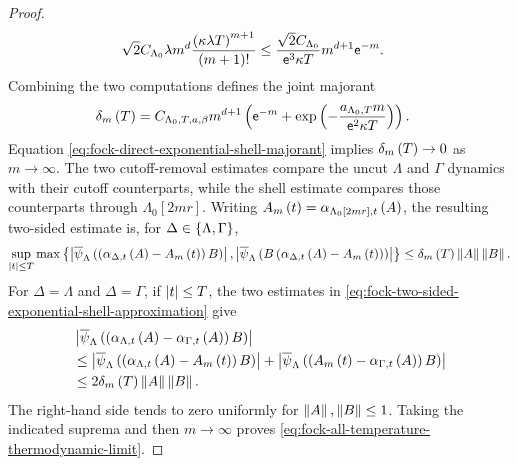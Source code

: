 \documentclass[11pt,a4paper]{article}
\theoremstyle{plain}
\theoremstyle{definition}
\theoremstyle{remark}
\begin{document}
\begin{proof}
$$\begin{aligned}
\sqrt{2}C_{\Lambda_0}\lambda m^d
\frac{\left( \kappa\lambda T \right)^{m+1}}{\left( m+1 \right)!}
& \leq
\frac{\sqrt{2}C_{\Lambda_0}}{\mathsf{e}^3\kappa T}
m^{d+1}\mathsf{e}^{-m}.
\end{aligned}$$
Combining the two computations defines the joint majorant
\begin{equation}
\begin{aligned}
\delta_m \left( T \right)
& =
C_{\Lambda_0,T,a,\beta}m^{d+1}
\left( 
\mathsf{e}^{-m}
+
\exp \left( -\frac{a_{\Lambda_0,T}m}{\mathsf{e}^2\kappa T} \right) \right).
\end{aligned}
\label{eq:fock-direct-exponential-shell-majorant}
\end{equation}
Equation \eqref{eq:fock-direct-exponential-shell-majorant} implies
$\delta_m \left( T \right)\to0$ as $m\to\infty$.
The two cutoff-removal estimates compare the uncut $\Lambda$ and $\Gamma$ dynamics with
their cutoff counterparts, while the shell estimate compares those counterparts through $\Lambda_0[2 m r]$.
Writing $A_m \left( t \right)=\alpha_{\Lambda_0[2mr],t} \left( A \right)$, the resulting two-sided estimate is,
for $\Delta \in \left\{ \Lambda,\Gamma \right\}$,
\begin{equation}
\begin{aligned}
\sup_{\abs{t}\leq T}
\max\setone{
\abs{\fun{\oastate[\overline{\psi}_{\Lambda}]}{
\rbk{\fun{\alpha_{\Delta,t}}{A}-\fun{A_m}{t}}B}},
\abs{\fun{\oastate[\overline{\psi}_{\Lambda}]}{
B\rbk{\fun{\alpha_{\Delta,t}}{A}-\fun{A_m}{t}}}}}
\leq
\fun{\delta_m}{T}\norm{A}\norm{B}.
\end{aligned}
\label{eq:fock-two-sided-exponential-shell-approximation}
\end{equation}
For $\Delta=\Lambda$ and $\Delta=\Gamma$,
if $\left| t \right| \leq T$,
the two estimates in
\eqref{eq:fock-two-sided-exponential-shell-approximation} give
$$\begin{aligned}
&
\abs{
\fun{\oastate[\overline{\psi}_{\Lambda}]}{
\rbk{\fun{\alpha_{\Lambda,t}}{A}-\fun{\alpha_{\Gamma,t}}{A}}B}}
\\
& \leq
\abs{
\fun{\oastate[\overline{\psi}_{\Lambda}]}{
\rbk{\fun{\alpha_{\Lambda,t}}{A}-\fun{A_m}{t}}B}}
+
\abs{
\fun{\oastate[\overline{\psi}_{\Lambda}]}{
\rbk{\fun{A_m}{t}-\fun{\alpha_{\Gamma,t}}{A}}B}}
\\
& \leq
2\fun{\delta_m}{T}\norm{A}\norm{B}.
\end{aligned}$$
The right-hand side tends to zero uniformly for $\left\Vert A \right\Vert,\left\Vert B \right\Vert\leq1$.
Taking the indicated suprema and then $m\to\infty$ proves
\eqref{eq:fock-all-temperature-thermodynamic-limit}.
\end{proof}
\end{document}

